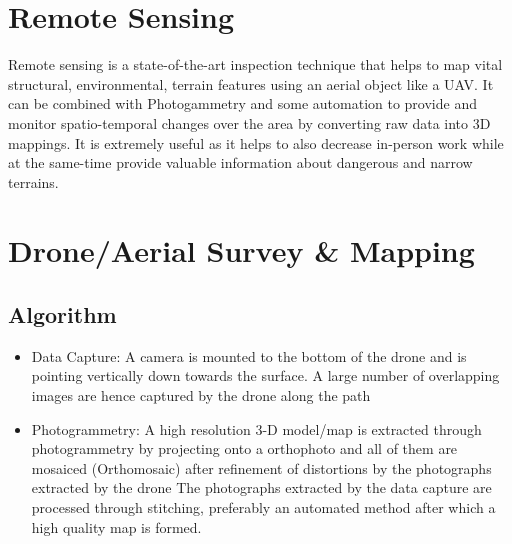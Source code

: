 \documentclass[11pt,twocolumn,letterpaper]{article}
\begin{document}
\section{Remote Sensing}

Remote sensing is a state-of-the-art inspection technique that helps to map vital structural, environmental, terrain features using an aerial object like a UAV. It can be combined with Photogammetry and some automation to provide and monitor spatio-temporal changes over the area by converting raw data into 3D mappings.
It is extremely useful as it helps to also decrease in-person work while at the same-time provide valuable information about dangerous and narrow terrains.

\section{Drone/Aerial Survey & Mapping}
\subsection{Algorithm}
\begin{itemize}
    \item Data Capture:
    A camera is mounted to the bottom of the drone and is pointing vertically down towards the surface. A large number of overlapping images are hence captured by the drone along the path
    \item Photogrammetry:
    A high resolution 3-D model/map is extracted through photogrammetry by projecting onto a orthophoto and all of them are mosaiced (Orthomosaic) after refinement of distortions by the photographs extracted by the drone
    The photographs extracted by the data capture are processed through stitching, preferably an automated method after which a high quality map is formed.
\end{itemize}
\end{document}
